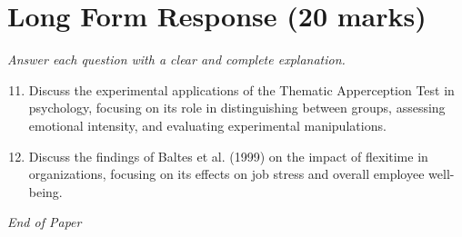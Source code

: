 \documentclass[12pt]{article}
\begin{document}
\section*{Long Form Response (20 marks)}
\textit{Answer each question with a clear and complete explanation.}
\begin{enumerate}[label=\arabic*.]
\setcounter{enumi}{10}
\item Discuss the experimental applications of the Thematic Apperception Test in psychology, focusing on its role in distinguishing between groups, assessing emotional intensity, and evaluating experimental manipulations.
\item Discuss the findings of Baltes et al. (1999) on the impact of flexitime in organizations, focusing on its effects on job stress and overall employee well-being.
\end{enumerate}

\vfill
\noindent\textit{End of Paper}
\end{document}
